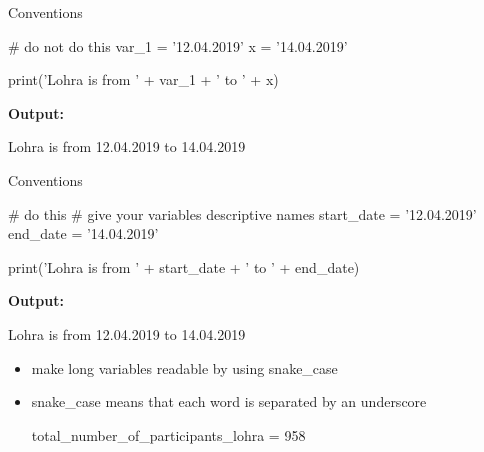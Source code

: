 \documentclass[
  american,
  ignorenonframetext,
]{beamer}
\newenvironment{pyexec}[1]{\noindent \textbf{Output: }  #1}{}
\begin{document}
\begin{frame}{Conventions}
\protect\hypertarget{conventions-1}{}

\begin{pythoncode}

# do not do this
var_1 = '12.04.2019'
x = '14.04.2019'

print('Lohra is from ' + var_1 + ' to ' + x)

\end{pythoncode}

\begin{pyexec}

\begin{outputcode}

Lohra is from 12.04.2019 to 14.04.2019

\end{outputcode}

\end{pyexec}

\end{frame}

\begin{frame}{Conventions}
\protect\hypertarget{conventions-2}{}

\begin{pythoncode}

# do this
# give your variables descriptive names
start_date = '12.04.2019'
end_date = '14.04.2019'

print('Lohra is from ' +  start_date
      + ' to ' + end_date)

\end{pythoncode}

\begin{pyexec}

\begin{outputcode}

Lohra is from 12.04.2019 to 14.04.2019

\end{outputcode}

\end{pyexec}

\end{frame}

\begin{frame}{}
\protect\hypertarget{section}{}

\begin{itemize}
\item
  make long variables readable by using snake\_case
\item
  snake\_case means that each word is separated by an underscore
  \vspace{1em}

  \begin{pythoncode}

  total_number_of_participants_lohra = 958

  \end{pythoncode}
\end{itemize}

\end{frame}
\end{document}

